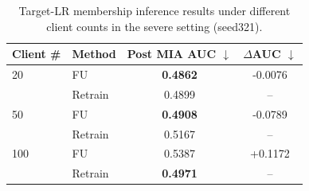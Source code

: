 \begin{table}[t]
\centering
\caption{Target-LR membership inference results under different client counts in the severe setting (seed321).}
\label{tab:targetlr_mia_clientcount}
\begin{tabular}{llcc}
\toprule
Client \# & Method & Post MIA AUC $\downarrow$ & $\Delta$AUC $\downarrow$ \\
\midrule
20 & FU & \textbf{0.4862} & -0.0076 \\
 & Retrain & 0.4899 & -- \\
\midrule
50 & FU & \textbf{0.4908} & -0.0789 \\
 & Retrain & 0.5167 & -- \\
\midrule
100 & FU & 0.5387 & +0.1172 \\
 & Retrain & \textbf{0.4971} & -- \\
\bottomrule
\end{tabular}
\end{table}